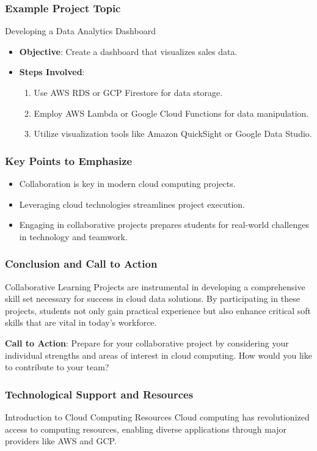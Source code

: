 \documentclass[aspectratio=169]{beamer}
\begin{document}
\begin{frame}[fragile]
    \frametitle{Example Project Topic}
    \begin{block}{Developing a Data Analytics Dashboard}
    \begin{itemize}
        \item \textbf{Objective}: Create a dashboard that visualizes sales data.
        \item \textbf{Steps Involved}:
        \begin{enumerate}
            \item Use AWS RDS or GCP Firestore for data storage.
            \item Employ AWS Lambda or Google Cloud Functions for data manipulation.
            \item Utilize visualization tools like Amazon QuickSight or Google Data Studio.
        \end{enumerate}
    \end{itemize}
    \end{block}
\end{frame}

\begin{frame}[fragile]
    \frametitle{Key Points to Emphasize}
    \begin{itemize}
        \item Collaboration is key in modern cloud computing projects.
        \item Leveraging cloud technologies streamlines project execution.
        \item Engaging in collaborative projects prepares students for real-world challenges in technology and teamwork.
    \end{itemize}
\end{frame}

\begin{frame}[fragile]
    \frametitle{Conclusion and Call to Action}
    Collaborative Learning Projects are instrumental in developing a comprehensive skill set necessary for success in cloud data solutions. By participating in these projects, students not only gain practical experience but also enhance critical soft skills that are vital in today’s workforce. 

    \textbf{Call to Action}: Prepare for your collaborative project by considering your individual strengths and areas of interest in cloud computing. How would you like to contribute to your team?
\end{frame}

\begin{frame}[fragile]
    \frametitle{Technological Support and Resources}
    \begin{block}{Introduction to Cloud Computing Resources}
        Cloud computing has revolutionized access to computing resources, enabling diverse applications through major providers like AWS and GCP.
    \end{block}
\end{frame}
\end{document}

